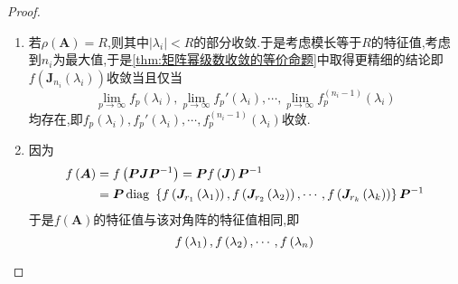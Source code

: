 {\begin{proof}
\begin{enumerate}[label=\arabic*)]
            \item 若$\rho\left(\bm{A}\right)=R$,则其中$\left|\lambda_i\right|<R$的部分收敛.于是考虑模长等于$R$的特征值,考虑到$n_i$为最大值,于是\cref{thm:矩阵幂级数收敛的等价命题}中取得更精细的结论即$f\left(
                      \bm{J}_{n_i}\left(\lambda_i\right)
                      \right)$收敛当且仅当\[
                      \lim_{p\to\infty}f_p\left(\lambda_i\right),\lim_{p\to\infty}f_p'\left(\lambda_i\right),\cdots,\lim_{p\to\infty}f_p^{\left(n_i-1\right)}\left(\lambda_i\right)
                  \]均存在,即$f_p\left(\lambda_i\right),f_p'\left(\lambda_i\right),\cdots,f_p^{\left(n_i-1\right)}\left(\lambda_i\right)$收敛.

            \item 因为\begin{align*}f\left(\bm{A}\right) & =f\left(\bm{PJP}^{-1}\right)=
              \bm{P}f\left(\bm{J}\right)\bm{P}^{-1}                \\
                                   & =\bm{P}\operatorname{diag\,} \,\left\{
              f\left(
              \bm{J}_{r_1}\left(\lambda_1\right)
              \right),f\left(
              \bm{J}_{r_2}\left(\lambda_2\right)
              \right),\cdots,f\left(
              \bm{J}_{r_k}\left(\lambda_k\right)
              \right)
              \right\}\bm{P}^{-1}
                  \end{align*}于是$f\left(\bm{A}\right)$的特征值与该对角阵的特征值相同,即\[
                      f\left(\lambda_1\right),f\left(\lambda_2\right),\cdots,f\left(\lambda_n\right)\qedhere
                  \]
        \end{enumerate}
    \end{proof}
}
